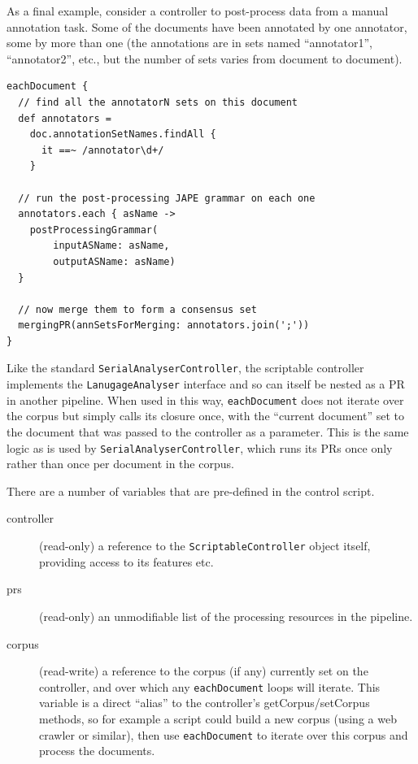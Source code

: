 As a final example, consider a controller to post-process data from a manual
annotation task.  Some of the documents have been annotated by one annotator,
some by more than one (the annotations are in sets named ``annotator1'',
``annotator2'', etc., but the number of sets varies from document to document).
\begin{lstlisting}
eachDocument {
  // find all the annotatorN sets on this document
  def annotators =
    doc.annotationSetNames.findAll {
      it ==~ /annotator\d+/
    }

  // run the post-processing JAPE grammar on each one
  annotators.each { asName ->
    postProcessingGrammar(
        inputASName: asName,
        outputASName: asName)
  }

  // now merge them to form a consensus set
  mergingPR(annSetsForMerging: annotators.join(';'))
}
\end{lstlisting}


Like the standard \lstinline!SerialAnalyserController!, the scriptable
controller implements the \lstinline!LanugageAnalyser! interface and so can
itself be nested as a PR in another pipeline.  When used in this way,
\lstinline!eachDocument! does not iterate over the corpus but simply calls its
closure once, with the ``current document'' set to the document that was passed
to the controller as a parameter.  This is the same logic as is used by
\lstinline!SerialAnalyserController!, which runs its PRs once only rather than
once per document in the corpus.


There are a number of variables that are pre-defined in the control script.
\begin{description}
\item[controller] (read-only) a reference to the {\tt ScriptableController}
  object itself, providing access to its features etc.
\item[prs] (read-only) an unmodifiable list of the processing resources in the
  pipeline.
\item[corpus] (read-write) a reference to the corpus (if any) currently set on
  the controller, and over which any {\tt eachDocument} loops will iterate.
  This variable is a direct ``alias'' to the controller's getCorpus/setCorpus
  methods, so for example a script could build a new corpus (using a web
  crawler or similar), then use {\tt eachDocument} to iterate over this corpus
  and process the documents.
\end{description}

